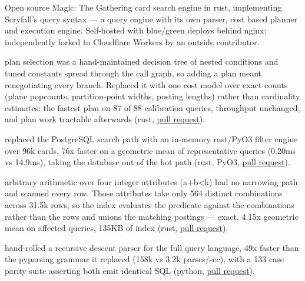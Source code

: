 


Open source Magic: The Gathering card search engine in rust, implementing Scryfall's query syntax --- a query engine with its own parser, cost based planner and execution engine. Self-hosted with blue/green deploys behind nginx; independently forked to Cloudflare Workers by an outside contributor.
\begin{bullets}
    \item {}plan selection was a hand-maintained decision tree of nested conditions and tuned constants spread through the call graph, so adding a plan meant renegotiating every branch. Replaced it with one cost model over exact counts (plane popcounts, partition-point widths, posting lengths) rather than cardinality estimates: the fastest plan on 87 of 88 calibration queries, throughput unchanged, and plan work tractable afterwards (rust, \href{https://github.com/jbylund/sylvan_librarian/pull/712}{pull request}).
    \item {}replaced the PostgreSQL search path with an in-memory rust/PyO3 filter engine over 96k cards, {\mytilde}76x faster on a geometric mean of representative queries (0.20ms vs 14.9ms), taking the database out of the
hot path (rust, PyO3, \href{https://github.com/jbylund/sylvan_librarian/pull/490}{pull request}).
    \item {}arbitrary arithmetic over four integer attributes (a+b<k) had no narrowing path and scanned every row. Those attributes take only {\mytilde}564 distinct combinations across 31.5k rows, so the index evaluates the predicate against the combinations rather than the rows and unions the matching postings --- exact, 4.15x geometric mean on affected queries, 135KB of index (rust, \href{https://github.com/jbylund/sylvan_librarian/pull/750}{pull request}).
    \item {}hand-rolled a recursive descent parser for the full query language, {\mytilde}49x faster than the pyparsing grammar it replaced (158k vs 3.2k parses/sec), with a 133 case parity suite asserting both emit identical SQL (python, \href{https://github.com/jbylund/sylvan_librarian/pull/482}{pull request}).
\end{bullets}

